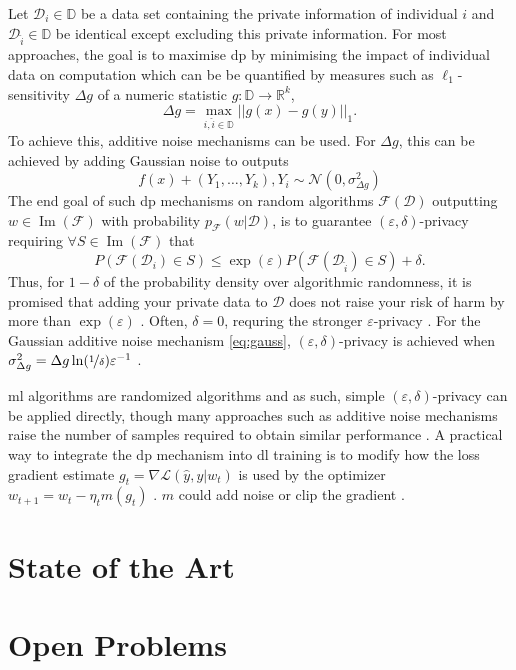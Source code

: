 \documentclass[12pt,fleqn,twocolumn]{article}
\newcommand{\RR}{\ensuremath{\mathbb R}}
\newcommand{\DD}{\ensuremath{\mathbb D}}
\newcommand{\reci}{\ensuremath{^{-1}}}
\begin{document}
Let $\mathcal D_i \in \DD$ be a data set containing the private information of individual $i$ and $\mathcal D_{\hat i} \in \DD$ be identical except excluding this private information.
For most approaches, the goal is to maximise \acrshort{dp} by minimising the impact of individual data on computation which can be be quantified by measures such as $\ell_1$-sensitivity \cite[pp.31]{dwork2014alg} $\Delta g$ of a numeric statistic $g: \DD \rightarrow \RR^k$,
\begin{equation}
    \Delta g= \operatorname{max}_{i, \hat i \in \DD} ||g(x)-g(y)||_1.
\end{equation}
To achieve this, additive noise mechanisms can be used.
For $\Delta g$, this can be achieved by adding Gaussian noise to outputs \cite[D 3.3]{dwork2014alg} 
\begin{equation}\label{eq:gauss}
  f(x)+(Y_1, \ldots, Y_k), Y_i \sim \mathcal N(0, \sigma_{\Delta g}^2)  
\end{equation}
The end goal of such \acrshort{dp} mechanisms on random algorithms $\mathcal F(\mathcal D)$ outputting $w \in \operatorname{Im}(\mathcal F)$ with probability $p_{\mathcal F}(w|\mathcal D)$, is to guarantee $(\varepsilon, \delta)$-privacy \cite[Def. 2.4]{dwork2014alg} requiring $\forall S \in \operatorname{Im}(\mathcal F)$ that
\begin{equation}
    P\left(
        \mathcal{F}(\mathcal D_i) \in S
    \right)
    \leq
    \exp(\varepsilon)
    P\left(
        \mathcal{F}(\mathcal D_{\hat i}) \in S
    \right)
    +\delta.
\end{equation}
Thus, for $1-\delta$ of the probability density over algorithmic randomness, it is promised that adding your private data to $\mathcal D$ does not raise your risk of harm by more than $\exp(\varepsilon)$ \cite[pp. 21]{dwork2014alg}.
Often, $\delta=0$, requring the stronger $\varepsilon$-privacy \cite{wiki2022diff}.
For the Gaussian additive noise mechanism \eqref{eq:gauss}, $(\varepsilon, \delta)$-privacy is achieved when $\sigma_{\Delta g}^2=\Delta g \ln(\nicefrac 1 \delta)\varepsilon\reci$ \cite[App. A]{dwork2014alg}.

\acrshort{ml} algorithms are randomized algorithms and as such, simple $(\varepsilon, \delta)$-privacy can be applied directly, though many approaches such as additive noise mechanisms raise the number of samples required to obtain similar performance \cite[pp.221]{dwork2014alg}.
A practical way to integrate the \acrshort{dp} mechanism into \acrshort{dl} training is to modify how the loss gradient estimate $g_t = \nabla \mathcal L(\hat y, y | w_t)$ is used by the optimizer $w_{t+1} = w_t - \eta_t m(g_t)$ \cite{rade2019tensorflow}.
$m$ could add noise or clip the gradient \cite{abadi2016dldp}.

\section*{State of the Art}%
\label{sec:State of The Art}

\section*{Open Problems}%
\label{sec:Open Problems}

\clearpage
\renewcommand*{\bibfont}{\normalfont\footnotesize}
\printbibliography[heading=bibintoc]

\printglossary[type=\acronymtype]
\end{document}
